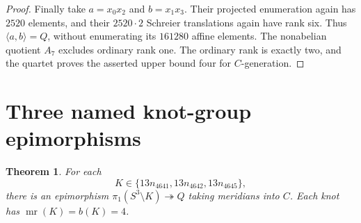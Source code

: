 \documentclass[11pt]{article}
\newtheorem{theorem}[lemma]{Theorem}
\newcommand{\mr}{\operatorname{mr}}
\begin{document}
\begin{proof}
Finally take $a=x_0x_2$ and $b=x_1x_3$.
Their projected enumeration again has $2520$ elements, and their
$2520\cdot2$ Schreier translations again have rank six. Thus
$\langle a,b\rangle=Q$, without enumerating its $161280$ affine
elements. The nonabelian quotient $A_7$ excludes ordinary rank one.
The ordinary rank is exactly two, and the quartet proves the asserted
upper bound four for $C$-generation.
\end{proof}

\section{Three named knot-group epimorphisms}

\begin{theorem}\label{thm:sharp}
For each
\[
                    K\in\{13n_{4641},13n_{4642},13n_{4645}\},
\]
there is an epimorphism $\pi_1(S^3\setminus K)\twoheadrightarrow Q$
taking meridians into $C$. Each knot has $\mr(K)=b(K)=4$.
\end{theorem}
\end{document}
